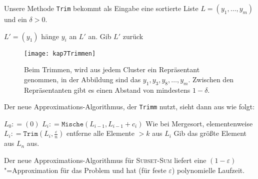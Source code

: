Unsere Methode \texttt{Trim} bekommt als Eingabe eine sortierte Liste $L = (y_1, \ldots, y_m)$ und ein $\delta >0$.

\begin{Alg}
  \begin{algorithmic}[1]
    \State $L' = (y_1)$
        \State hänge $y_i$ an $L'$ an.
      \EndIf
    \EndFor
    \State Gib $L'$ zurück
  \end{algorithmic}
\end{Alg}

\begin{figure}[htb]
  \centering
  \texttt{[image: kap7Trimmen]}
  \caption{Beim Trimmen, wird aus jedem Cluster ein Repräsentant genommen, in der Abbildung sind das $y_1, y_3, y_8, \ldots, y_m$. Zwischen den Repräsentanten gibt es einen Abstand von mindestens $1 - \delta$.}
\end{figure}

Der neue Approximations-Algorithmus, der \texttt{Trimm} nutzt, sieht dann aus wie folgt:
\begin{Alg}
  \begin{algorithmic}[1]
    \State $L_0 \mathrel{\mathop:}= (0)$
      \State $L_i \mathrel{\mathop:}= \mathtt{Mische}(L_{i-1}, L_{i-1} + c_i)$ \Comment Wie bei Mergesort, elementenweise
      \State $L_i \mathrel{\mathop:}= \mathtt{Trim}(L_i, \frac{\varepsilon}{n})$
      \State entferne alle Elemente $>k$ aus $L_i$
    \EndFor
    \State Gib das größte Element aus $L_n$ aus.
  \end{algorithmic}
\end{Alg}

\begin{Beh}
  \hspace{\parindent}Der neue Approximations-Algorithmus für \textsc{Subset-Sum} liefert eine $(1-\varepsilon)$"=Approximation für das Problem und hat (für feste $\varepsilon$) polynomielle Laufzeit.
\end{Beh}

